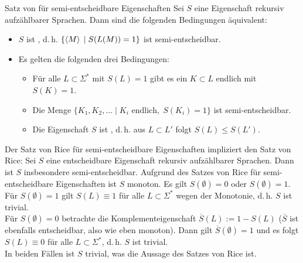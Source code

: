 \linie
\pagebreak

\begin{Satz}{Satz von  für semi-entscheidbare Eigenschaften}
    Sei $S$ eine Eigenschaft rekursiv aufzählbarer Sprachen.
    Dann sind die folgenden Bedingungen äquivalent:
    \begin{itemize}
        \item
        $S$ ist , d.\,h.
        $\{\left\langle M\right\rangle \;|\; S(L(M)) = 1\}$ ist semi-entscheidbar.
        
        \item
        Es gelten die folgenden drei Bedingungen:
        \begin{itemize}
            \item
            Für alle $L \subset \Sigma^\ast$ mit $S(L) = 1$ gibt es ein $K \subset L$ endlich mit
            $S(K) = 1$.
            
            \item
            Die Menge $\{K_1, K_2, \dotsc \;|\; K_i \text{ endlich},\; S(K_i) = 1\}$ ist
            semi-entscheidbar.
            
            \item
            Die Eigenschaft $S$ ist , d.\,h. aus $L \subset L'$ folgt
            $S(L) \le S(L')$.
        \end{itemize}
    \end{itemize}
\end{Satz}

\linie

\begin{Bem}
    Der Satz von Rice für semi-entscheidbare Eigenschaften impliziert den Satz von Rice:
    Sei $S$ eine entscheidbare Eigenschaft rekursiv aufzählbarer Sprachen.
    Dann ist $S$ insbesondere semi-entscheidbar.
    Aufgrund des Satzes von Rice für semi-entscheidbare Eigenschaften ist $S$ monoton.
    Es gilt $S(\emptyset) = 0$ oder $S(\emptyset) = 1$.\\
    Für $S(\emptyset) = 1$ gilt $S(L) \equiv 1$ für alle $L \subset \Sigma^\ast$
    wegen der Monotonie, d.\,h. $S$ ist trivial.\\
    Für $S(\emptyset) = 0$ betrachte die Komplementeigenschaft $\overline{S}(L) := 1 - S(L)$
    ($\overline{S}$ ist ebenfalls entscheidbar, also wie eben monoton).
    Dann gilt $\overline{S}(\emptyset) = 1$ und es folgt $S(L) \equiv 0$ für alle
    $L \subset \Sigma^\ast$, d.\,h. $S$ ist trivial.\\
    In beiden Fällen ist $S$ trivial, was die Aussage des Satzes von Rice ist.
\end{Bem}

